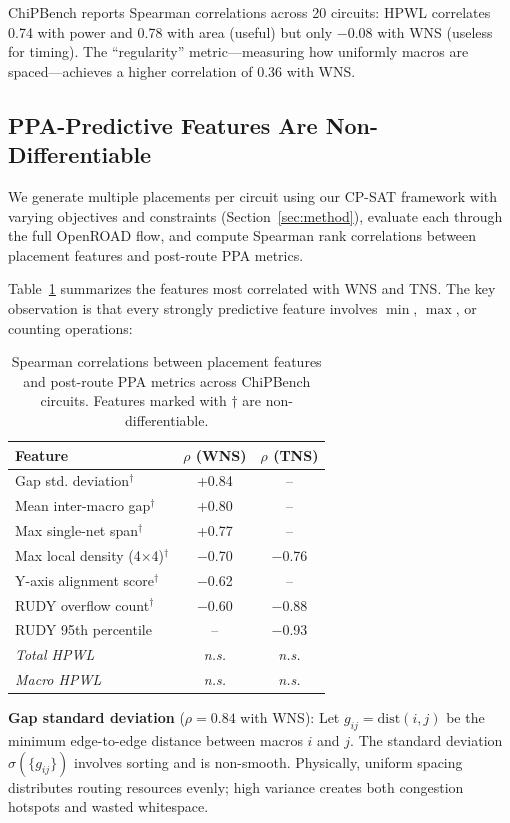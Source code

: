 \documentclass[sigconf,anonymous,review,9pt]{acmart}
\begin{document}
ChiPBench reports Spearman correlations across 20 circuits: HPWL correlates 0.74 with power and 0.78 with area (useful) but only $-0.08$ with WNS (useless for timing). The ``regularity'' metric---measuring how uniformly macros are spaced---achieves a higher correlation of 0.36 with WNS.

\subsection{PPA-Predictive Features Are Non-Differentiable}

We generate multiple placements per circuit using our CP-SAT framework with varying objectives and constraints (Section~\ref{sec:method}), evaluate each through the full OpenROAD flow, and compute Spearman rank correlations between placement features and post-route PPA metrics.

Table~\ref{tab:correlations} summarizes the features most correlated with WNS and TNS. The key observation is that every strongly predictive feature involves $\min$, $\max$, or counting operations:

\begin{table}[t]
\centering
\caption{Spearman correlations between placement features and post-route PPA metrics across ChiPBench circuits. Features marked with $\dagger$ are non-differentiable.}
\label{tab:correlations}
\small
\setlength{\tabcolsep}{4pt}
\begin{tabular}{lcc}
\toprule
Feature & $\rho$ (WNS) & $\rho$ (TNS) \\
\midrule
Gap std. deviation$^\dagger$ & +0.84 & -- \\
Mean inter-macro gap$^\dagger$ & +0.80 & -- \\
Max single-net span$^\dagger$ & +0.77 & -- \\
Max local density (4$\times$4)$^\dagger$ & $-$0.70 & $-$0.76 \\
Y-axis alignment score$^\dagger$ & $-$0.62 & -- \\
RUDY overflow count$^\dagger$ & $-$0.60 & $-$0.88 \\
RUDY 95th percentile & -- & $-$0.93 \\
\midrule
\textit{Total HPWL} & \textit{n.s.} & \textit{n.s.} \\
\textit{Macro HPWL} & \textit{n.s.} & \textit{n.s.} \\
\bottomrule
\end{tabular}
\end{table}

\textbf{Gap standard deviation} ($\rho = 0.84$ with WNS): Let $g_{ij} = \text{dist}(i, j)$ be the minimum edge-to-edge distance between macros $i$ and $j$. The standard deviation $\sigma(\{g_{ij}\})$ involves sorting and is non-smooth. Physically, uniform spacing distributes routing resources evenly; high variance creates both congestion hotspots and wasted whitespace.
\end{document}
